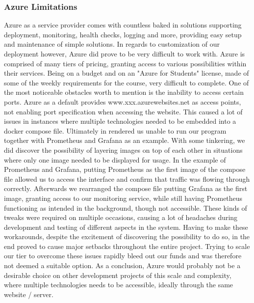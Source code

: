 \documentclass{article}
\begin{document}
    \subsubsection{Azure Limitations}
    Azure as a service provider comes with countless baked in solutions supporting deployment, monitoring, health checks, logging and more, providing easy setup and maintenance of simple solutions. In regards to customization of our deployment however, Azure did prove to be very difficult to work with. Azure is comprised of many tiers of pricing, granting access to various possibilities within their services. Being on a budget and on an "Azure for Students" license, made of some of the weekly requirements for the course, very difficult to complete.
    One of the most noticeable obstacles worth to mention is the inability to access certain ports.
    Azure as a default provides www.{xxx}.azurewebsites.net as access points, not enabling port specification when accessing the website. This caused a lot of issues in instances where multiple technologies needed to be embedded into a docker compose file. Ultimately in rendered us unable to run our program together with Prometheus and Grafana as an example.
    With some tinkering, we did discover the possibility of layering images on top of each other in situations where only one image needed to be displayed for usage. In the example of Prometheus and Grafana, putting Prometheus as the first image of the compose file allowed us to access the interface and confirm that traffic was flowing through correctly. Afterwards we rearranged the compose file putting Grafana as the first image, granting access to our monitoring service, while still having Prometheus functioning as intended in the background, though not accessible.
    These kinds of tweaks were required on multiple occasions, causing a lot of headaches during development and testing of different aspects in the system.
    Having to make these workarounds, despite the excitement of discovering the possibility to do so, in the end proved to cause major setbacks throughout the entire project. Trying to scale our tier to overcome these issues rapidly bleed out our funds and was therefore not deemed a suitable option.
    As a conclusion, Azure would probably not be a desirable choice on other development projects of this scale and complexity, where multiple technologies needs to be accessible, ideally through the same website / server.
    \newpage
\end{document}
